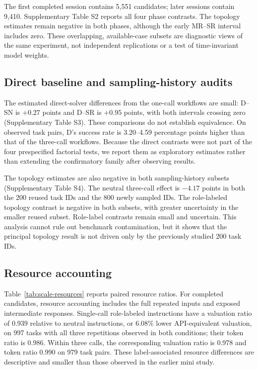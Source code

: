 \documentclass[pdflatex,sn-nature]{scientificreports}
\begin{document}
The first completed session contains 5,551 candidates; later sessions contain 9,410. Supplementary Table S2 reports all four phase contrasts. The topology estimates remain negative in both phases, although the early MR--SR interval includes zero. These overlapping, available-case subsets are diagnostic views of the same experiment, not independent replications or a test of time-invariant model weights.



\subsection{Direct baseline and sampling-history audits}
The estimated direct-solver differences from the one-call workflows are small: D--SN is $+0.27$ points and D--SR is $+0.95$ points, with both intervals crossing zero (Supplementary Table S3). These comparisons do not establish equivalence. On observed task pairs, D's success rate is 3.20--4.59 percentage points higher than that of the three-call workflows. Because the direct contrasts were not part of the four prespecified factorial tests, we report them as exploratory estimates rather than extending the confirmatory family after observing results.



The topology estimates are also negative in both sampling-history subsets (Supplementary Table S4). The neutral three-call effect is $-4.17$ points in both the 200 reused task IDs and the 800 newly sampled IDs. The role-labeled topology contrast is negative in both subsets, with greater uncertainty in the smaller reused subset. Role-label contrasts remain small and uncertain. This analysis cannot rule out benchmark contamination, but it shows that the principal topology result is not driven only by the previously studied 200 task IDs.




\subsection{Resource accounting}
Table~\ref{tab:scale-resources} reports paired resource ratios. For completed candidates, resource accounting includes the full repeated inputs and exposed intermediate responses. Single-call role-labeled instructions have a valuation ratio of 0.939 relative to neutral instructions, or 6.08\% lower API-equivalent valuation, on 997 tasks with all three repetitions observed in both conditions; their token ratio is 0.986. Within three calls, the corresponding valuation ratio is 0.978 and token ratio 0.990 on 979 task pairs. These label-associated resource differences are descriptive and smaller than those observed in the earlier mini study.
\end{document}
